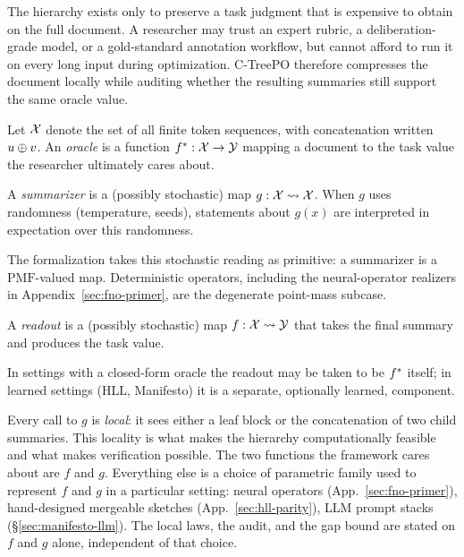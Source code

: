 The hierarchy exists only to preserve a task judgment that is expensive to obtain on the full document. A researcher may trust an expert rubric, a deliberation-grade model, or a gold-standard annotation workflow, but cannot afford to run it on every long input during optimization. C-TreePO therefore compresses the document locally while auditing whether the resulting summaries still support the same oracle value.

\begin{definition}[Oracle]\label{def:oracle}
Let $\mathcal{X}$ denote the set of all finite token sequences, with concatenation written $u \oplus v$. An \emph{oracle} is a function $f^\ast: \mathcal{X} \to \mathcal{Y}$ mapping a document to the task value the researcher ultimately cares about.
\end{definition}

\begin{definition}[Summarizer]\label{def:summarizer}
A \emph{summarizer} is a (possibly stochastic) map $g: \mathcal{X} \rightsquigarrow \mathcal{X}$. When $g$ uses randomness (temperature, seeds), statements about $g(x)$ are interpreted in expectation over this randomness.
\end{definition}

The formalization takes this stochastic reading as primitive: a summarizer is a $\mathrm{PMF}$-valued map. Deterministic operators, including the neural-operator realizers in Appendix~\ref{sec:fno-primer}, are the degenerate point-mass subcase.

\begin{definition}[Readout]\label{def:readout}
A \emph{readout} is a (possibly stochastic) map $f : \mathcal{X} \rightsquigarrow \mathcal{Y}$ that takes the final summary and produces the task value.
\end{definition}

In settings with a closed-form oracle the readout may be taken to be $f^\ast$ itself; in learned settings (HLL, Manifesto) it is a separate, optionally learned, component.

Every call to $g$ is \emph{local}: it sees either a leaf block or the concatenation of two child summaries. This locality is what makes the hierarchy computationally feasible and what makes verification possible. The two functions the framework cares about are $f$ and $g$. Everything else is a choice of parametric family used to represent $f$ and $g$ in a particular setting: neural operators (App.~\ref{sec:fno-primer}), hand-designed mergeable sketches (App.~\ref{sec:hll-parity}), LLM prompt stacks (\S\ref{sec:manifesto-llm}). The local laws, the audit, and the gap bound are stated on $f$ and $g$ alone, independent of that choice.

